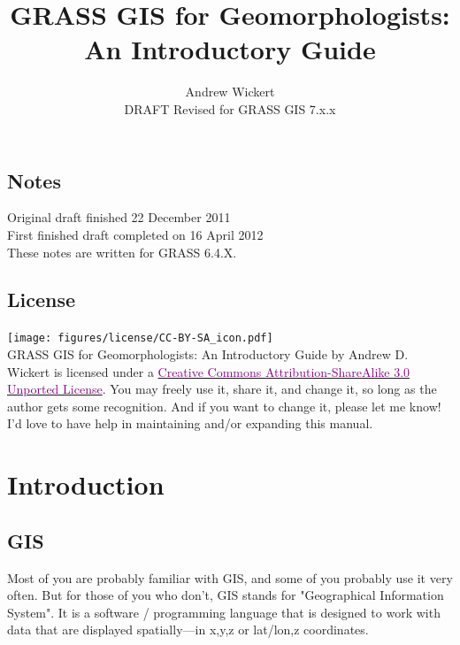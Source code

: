 \documentclass{book}
\title{GRASS GIS for Geomorphologists:\\An Introductory Guide}
\author{Andrew Wickert\\\vspace{12pt}DRAFT Revised for GRASS GIS 7.x.x}
\begin{document}
\maketitle

\tableofcontents
\listofboxxs

\section*{Notes}

\noindent Original draft finished 22 December 2011 \\

\noindent First finished draft completed on 16 April 2012 \\

\noindent These notes are written for GRASS 6.4.X. \\

\section*{License}

\texttt{[image: figures/license/CC-BY-SA\_icon.pdf]} \\
GRASS GIS for Geomorphologists: An Introductory Guide by Andrew D. Wickert is licensed under a \href{http://creativecommons.org/licenses/by-sa/3.0/}{\textcolor{purple}{Creative Commons Attribution-ShareAlike 3.0 Unported License}}. You may freely use it, share it, and change it, so long as the author gets some recognition. And if you want to change it, please let me know! I'd love to have help in maintaining and/or expanding this manual.

\chapter{Introduction}

\section{GIS}

Most of you are probably familiar with GIS, and some of you probably use it very often. But for those of you who don't, GIS stands for "Geographical Information System". It is a software / programming language that is designed to work with data that are displayed spatially---in x,y,z or lat/lon,z coordinates.
\end{document}
